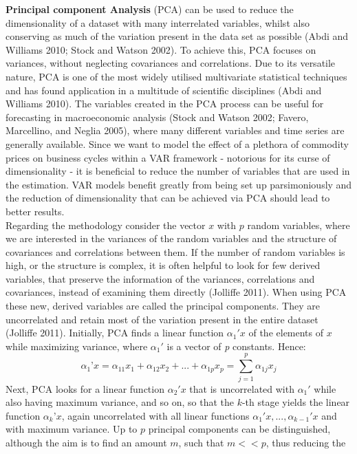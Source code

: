 \documentclass[12pt,]{article}
\begin{document}
\textbf{Principal component Analysis} (PCA) can be used to reduce the
dimensionality of a dataset with many interrelated variables, whilst
also conserving as much of the variation present in the data set as
possible (Abdi and Williams 2010; Stock and Watson 2002). To achieve
this, PCA focuses on variances, without neglecting covariances and
correlations. Due to its versatile nature, PCA is one of the most widely
utilised multivariate statistical techniques and has found application
in a multitude of scientific disciplines (Abdi and Williams 2010). The
variables created in the PCA process can be useful for forecasting in
macroeconomic analysis (Stock and Watson 2002; Favero, Marcellino, and
Neglia 2005), where many different variables and time series are
generally available. Since we want to model the effect of a plethora of
commodity prices on business cycles within a VAR framework - notorious
for its curse of dimensionality - it is beneficial to reduce the number
of variables that are used in the estimation. VAR models benefit greatly
from being set up parsimoniously and the reduction of dimensionality
that can be achieved via PCA should lead to better results.\\
Regarding the methodology consider the vector \(x\) with \(p\) random
variables, where we are interested in the variances of the random
variables and the structure of covariances and correlations between
them. If the number of random variables is high, or the structure is
complex, it is often helpful to look for few derived variables, that
preserve the information of the variances, correlations and covariances,
instead of examining them directly (Jolliffe 2011). When using PCA these
new, derived variables are called the principal components. They are
uncorrelated and retain most of the variation present in the entire
dataset (Jolliffe 2011). Initially, PCA finds a linear function
\(\alpha_1' x\) of the elements of \(x\) while maximizing variance,
where \(\alpha_1'\) is a vector of \emph{p} constants. Hence:
\[\alpha_1’x = \alpha_{11} x_1 + \alpha_{12} x_2 + ... + \alpha_{1p} x_p = \sum_{j=1}^p \alpha_{1j} x_j\]
Next, PCA looks for a linear function \(\alpha_2' x\) that is
uncorrelated with \(\alpha_1'\) while also having maximum variance, and
so on, so that the \(k\)-th stage yields the linear function
\(\alpha_k’ x\), again uncorrelated with all linear functions
\(\alpha_1' x, ..., \alpha_{k-1}' x\) and with maximum variance. Up to
\(p\) principal components can be distinguished, although the aim is to
find an amount \(m\), such that \(m << p\), thus reducing the
\end{document}
